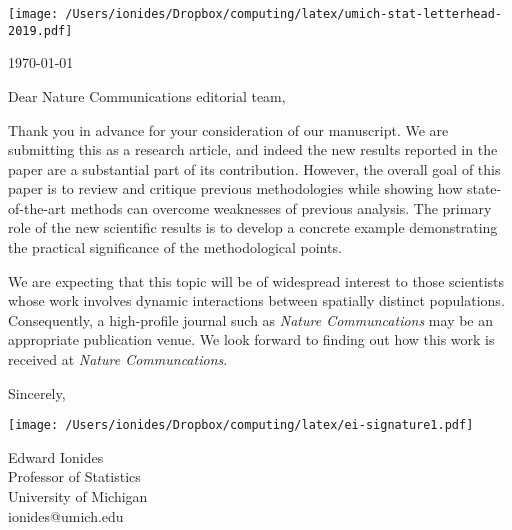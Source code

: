 \documentclass[11pt]{article}
\begin{document}
\rule{0cm}{0.3cm}

\vspace{-8mm}

\texttt{[image: /Users/ionides/Dropbox/computing/latex/umich-stat-letterhead-2019.pdf]}

\vspace{5mm}

\begin{flushright}
\today
\end{flushright}




\vspace{3mm}

Dear Nature Communications editorial team,

\vspace{2mm}

Thank you in advance for your consideration of our manuscript.
We are submitting this as a research article, and indeed the new results reported in the paper are a substantial part of its contribution.
However, the overall goal of this paper is to review and critique previous methodologies while showing how state-of-the-art methods can overcome weaknesses of previous analysis.
The primary role of the new scientific results is to develop a concrete example demonstrating the practical significance of the methodological points.

We are expecting that this topic will be of widespread interest to those scientists whose work involves dynamic interactions between spatially distinct populations. 
Consequently, a high-profile journal such as {\em Nature Communcations} may be an appropriate publication venue.
We look forward to finding out how this work is received at  {\em Nature Communcations}.

Sincerely,

\vspace{-2mm}

\hspace{3cm}
\texttt{[image: /Users/ionides/Dropbox/computing/latex/ei-signature1.pdf]}

\vspace{-5mm}

Edward Ionides \\
Professor of Statistics\\
University of Michigan\\
ionides@umich.edu
\end{document}
